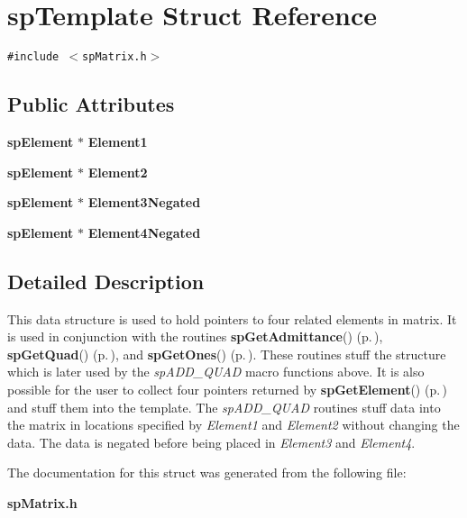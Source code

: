 \section{sp\-Template Struct Reference}
\label{structspTemplate}
{\tt \#include $<$sp\-Matrix.h$>$}

\subsection*{Public Attributes}
\begin{CompactItemize}
\item 
{}
{\bf sp\-Element} $\ast$ {\bf Element1}\label{structspTemplate_m0}

\item 
{}
{\bf sp\-Element} $\ast$ {\bf Element2}\label{structspTemplate_m1}

\item 
{}
{\bf sp\-Element} $\ast$ {\bf Element3Negated}\label{structspTemplate_m2}

\item 
{}
{\bf sp\-Element} $\ast$ {\bf Element4Negated}\label{structspTemplate_m3}

\end{CompactItemize}


\subsection{Detailed Description}
This data structure is used to hold pointers to four related elements in matrix. It is used in conjunction with the routines {\bf sp\-Get\-Admittance}() {\rm (p.\,\pageref{spBuild_8c_a13})}, {\bf sp\-Get\-Quad}() {\rm (p.\,\pageref{spBuild_8c_a14})}, and {\bf sp\-Get\-Ones}() {\rm (p.\,\pageref{spBuild_8c_a15})}. These routines stuff the structure which is later used by the {\em sp\-ADD\_\-QUAD} macro functions above. It is also possible for the user to collect four pointers returned by {\bf sp\-Get\-Element}() {\rm (p.\,\pageref{spBuild_8c_a12})} and stuff them into the template. The {\em sp\-ADD\_\-QUAD} routines stuff data into the matrix in locations specified by {\em Element1} and {\em Element2} without changing the data. The data is negated before being placed in {\em Element3} and {\em Element4}. 



The documentation for this struct was generated from the following file:\begin{CompactItemize}
\item 
{\bf sp\-Matrix.h}\end{CompactItemize}
